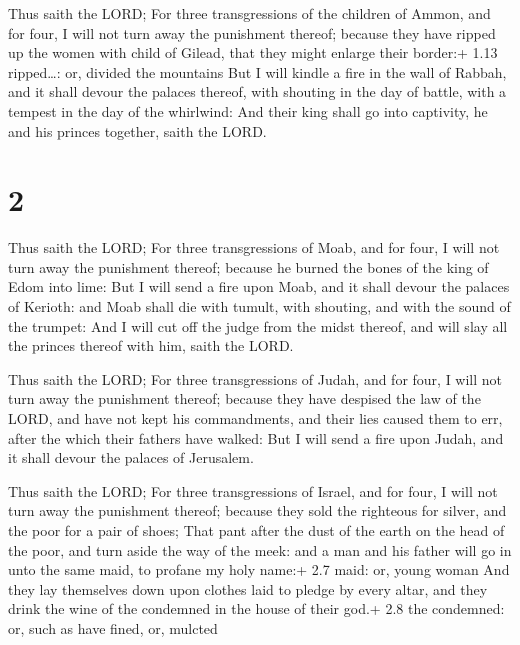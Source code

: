  Thus saith the LORD; For three transgressions of the
children of Ammon, and for four, I will not turn away the punishment
thereof; because they have ripped up the women with child of Gilead,
that they might enlarge their border:+ 1.13 ripped\ldots: or, divided
the mountains  But I will kindle a fire in the wall of
Rabbah, and it shall devour the palaces thereof, with shouting in the
day of battle, with a tempest in the day of the whirlwind: 
And their king shall go into captivity, he and his princes together,
saith the LORD.

\hypertarget{section-1}{%
\section{2}\label{section-1}}

 Thus saith the LORD; For three transgressions of Moab, and
for four, I will not turn away the punishment thereof; because he burned
the bones of the king of Edom into lime:  But I will send a
fire upon Moab, and it shall devour the palaces of Kerioth: and Moab
shall die with tumult, with shouting, and with the sound of the trumpet:
 And I will cut off the judge from the midst thereof, and
will slay all the princes thereof with him, saith the LORD.

 Thus saith the LORD; For three transgressions of Judah,
and for four, I will not turn away the punishment thereof; because they
have despised the law of the LORD, and have not kept his commandments,
and their lies caused them to err, after the which their fathers have
walked:  But I will send a fire upon Judah, and it shall
devour the palaces of Jerusalem.

 Thus saith the LORD; For three transgressions of Israel,
and for four, I will not turn away the punishment thereof; because they
sold the righteous for silver, and the poor for a pair of shoes;
 That pant after the dust of the earth on the head of the
poor, and turn aside the way of the meek: and a man and his father will
go in unto the same maid, to profane my holy name:+ 2.7 maid: or, young
woman  And they lay themselves down upon clothes laid to
pledge by every altar, and they drink the wine of the condemned in the
house of their god.+ 2.8 the condemned: or, such as have fined, or,
mulcted

